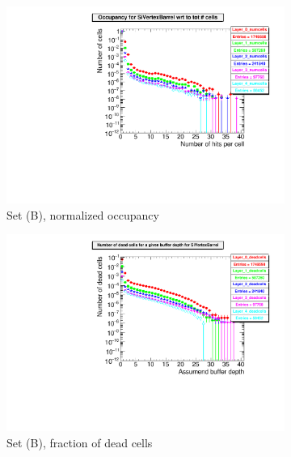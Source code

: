   \begin{figure}[htb]\ContinuedFloat
     \begin{subfigure}[b]{0.49\textwidth}
   \centering
    \includegraphics[width=\textwidth]{Figures/Pairs/Appendix/occupancy_numcells_SiVertexBarrel_ILC250_SetB_corrected_Barrel_size.pdf}
   \caption{Set (B), normalized occupancy}
   \end{subfigure}
   \hfill
    \begin{subfigure}[b]{0.49\textwidth}
   \centering
    \includegraphics[width=\textwidth]{Figures/Pairs/Appendix/occupancy_deadcells_SiVertexBarrel_ILC250_SetB_corrected_Barrel_size.pdf}
    \caption{Set (B), fraction of dead cells}
   \end{subfigure}\\
     \begin{subfigure}[b]{0.49\textwidth}

\end{subfigure}
\end{figure}
